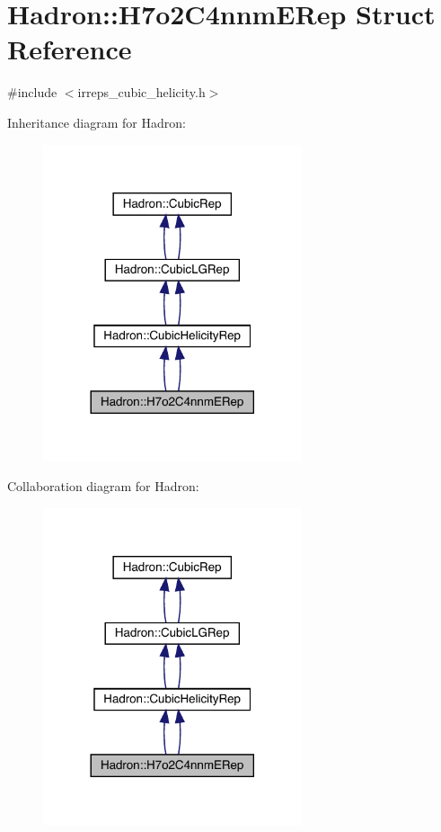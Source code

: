 \hypertarget{structHadron_1_1H7o2C4nnmERep}{}\section{Hadron\+:\+:H7o2\+C4nnm\+E\+Rep Struct Reference}
\label{structHadron_1_1H7o2C4nnmERep}


{\ttfamily \#include $<$irreps\+\_\+cubic\+\_\+helicity.\+h$>$}



Inheritance diagram for Hadron\+:\nopagebreak
\begin{figure}[H]
\begin{center}
\leavevmode
\includegraphics[width=216pt]{dd/d6a/structHadron_1_1H7o2C4nnmERep__inherit__graph}
\end{center}
\end{figure}


Collaboration diagram for Hadron\+:\nopagebreak
\begin{figure}[H]
\begin{center}
\leavevmode
\includegraphics[width=216pt]{df/d87/structHadron_1_1H7o2C4nnmERep__coll__graph}
\end{center}
\end{figure}
